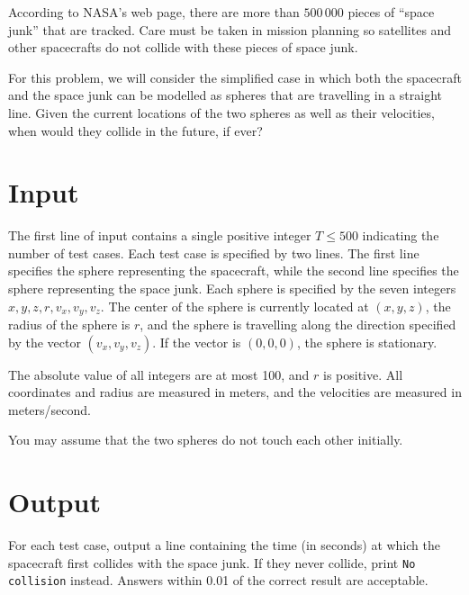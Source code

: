 

\setlength{\columnsep}{15pt}



According to NASA's web page, there are more than $500\,000$ pieces of
``space junk'' that are tracked.  Care must be taken in mission
planning so satellites and other spacecrafts do not collide with
these pieces of space junk.

For this problem, we will consider the simplified case in which both
the spacecraft and the space junk can be modelled as spheres that are
travelling in a straight line.  Given the current locations of the two
spheres as well as their velocities, when would they collide in the
future, if ever?

\section*{Input}
The first line of input contains a single positive integer $T \leq
500$ indicating the number of test cases.  Each test case is specified
by two lines.  The first line specifies the sphere representing the
spacecraft, while the second line specifies the sphere representing
the space junk.  Each sphere is specified by the seven integers $ x,
y, z, r, v_x, v_y, v_z$.  The center of the sphere is currently
located at $(x,y,z)$, the radius of the sphere is $r$, and the sphere
is travelling along the direction specified by the vector $(v_x,v_y,
v_z)$.  If the vector is $(0,0,0)$, the sphere is stationary.

The absolute value of all integers are at most 100, and $r$ is
positive.  All coordinates and radius are measured in meters, and the
velocities are measured in meters/second.  

You may assume that the two spheres do not touch each other initially.

\section*{Output}

For each test case, output a line containing the time (in seconds) at
which the spacecraft first collides with the space junk.  If they
never collide, print \verb|No collision| instead.  Answers within 0.01
of the correct result are acceptable.

